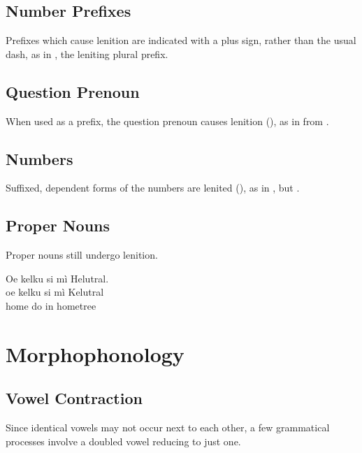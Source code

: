 \subsection{Number Prefixes} Prefixes which cause lenition are
indicated with a plus sign, rather than the usual dash, as in ,
the leniting plural prefix. 

\subsection{Question Prenoun} When used as a prefix, the question
prenoun  causes lenition (), as
in   from  .

\subsection{Numbers}
Suffixed, dependent forms of the numbers are lenited
(), as in  ,
but  .

\subsection{Proper Nouns} Proper nouns still undergo lenition.

\begin{interlin} \label{lenition:ex01}
\glll Oe kelku si mì Helutral. \\
      oe kelku si mì Kelutral \\
      home do in hometree \\
\end{interlin}


\section{Morphophonology}

\subsection{Vowel Contraction} Since identical vowels may not occur
next to each other, a few grammatical processes involve a doubled
vowel reducing to just one.\label{l-and-s:contract}

